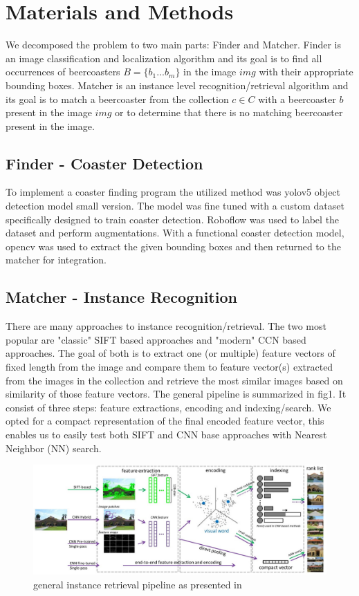 \documentclass{article}
\begin{document}
\section{Materials and Methods}
We decomposed the problem to two main parts: Finder and Matcher.
Finder is an image classification and localization algorithm and its goal is to find all
occurrences of beercoasters $B=\{b_1...b_m\}$ in the image $img$ with their appropriate bounding boxes.
Matcher is an instance level recognition/retrieval algorithm and its goal is to match 
a beercoaster from the collection $c \in C$ with a beercoaster $b$ present in the image $img$
or to determine that there is no matching beercoaster present in the image.

\subsection{Finder - Coaster Detection}

To implement a coaster finding program the utilized method was yolov5 object detection model small version. The model was fine tuned
with a custom dataset specifically designed to train coaster detection. Roboflow was used to label the dataset and perform augmentations.
With a functional coaster detection model, opencv was used to extract the given bounding boxes and then returned to the matcher for 
integration.

\subsection{Matcher - Instance Recognition}

There are many approaches to instance recognition/retrieval. 
The two most popular are "classic" SIFT based approaches and "modern" CCN based approaches.
The goal of both is to extract one (or multiple) feature vectors of fixed length from the image and compare them to feature vector(s) extracted from the images in the collection and retrieve the most similar images based on similarity of those feature vectors.
The general pipeline is summarized in fig1.
It consist of three steps: feature extractions, encoding and indexing/search.
We opted for a compact representation of the final encoded feature vector, this enables us to easily test both SIFT and CNN base approaches with Nearest Neighbor (NN) search.

\begin{figure}[H]
    \center
    \includegraphics[scale=0.5]{img/img-rec-pipeline.jpg}
    \caption{general instance retrieval pipeline as presented in \cite{}}
\end{figure}
\end{document}
